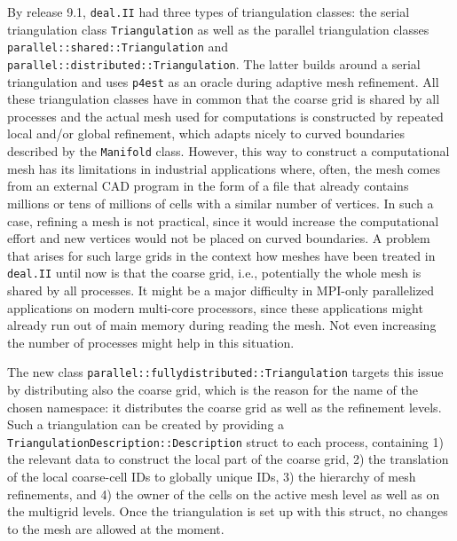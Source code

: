 \documentclass{ansarticle-preprint}
\begin{document}
By release 9.1, \texttt{deal.II} had three types of triangulation classes: the 
serial triangulation class \texttt{Triangulation} as well as the parallel 
triangulation classes \texttt{parallel::shared::Triangulation} and \texttt{parallel::distributed::Triangulation}. The latter builds around a serial 
triangulation and uses \texttt{p4est} as an oracle during adaptive mesh refinement. 
All these triangulation classes have in common that the coarse grid is shared by 
all processes and the actual mesh used for computations is constructed by repeated 
local and/or global refinement, which adapts nicely to curved boundaries described 
by the \texttt{Manifold} class. However, this way to construct a computational 
mesh has its limitations in industrial applications where, often, the mesh comes 
from an external CAD program in the form of a file that already contains millions 
or tens of millions of cells with a similar number of vertices. In such a case, 
refining a mesh is not practical, since it would increase the computational effort 
and new vertices would not be placed on curved boundaries. A problem that arises 
for such large grids in the context how meshes have been treated in \texttt{deal.II} 
until now is that the coarse grid, i.e., potentially the whole mesh is shared by 
all processes. It might be a major difficulty in MPI-only parallelized applications 
on modern multi-core processors, since these applications might already run out of 
main memory during reading the mesh. Not even increasing the number of processes 
might help in this situation. 

The new class \texttt{parallel::fullydistributed::Triangulation} targets this issue 
by distributing also the coarse grid, which is the reason for the name of the 
chosen namespace: it distributes the coarse grid as well as the refinement levels. Such 
a triangulation can be created by providing a \texttt{TriangulationDescription::Description} struct to each process, containing 
1) the relevant data to construct the local part of the coarse grid, 2) the 
translation of the local coarse-cell IDs to globally unique IDs, 3) the hierarchy 
of mesh refinements, and 4) the owner of the cells on the active mesh level as well 
as on the multigrid levels. Once the triangulation is set up with this struct, no 
changes to the mesh are allowed at the moment.
 
\end{document}
